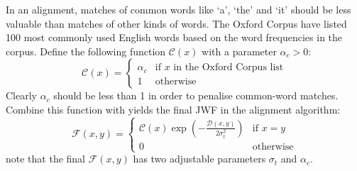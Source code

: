 In an alignment, matches of common words like `a', `the' and `it' should be less valuable than matches of other kinds of words. The Oxford Corpus have listed 100 most commonly used English words \cite{oec-common-words} based on the word frequencies in the corpus. Define the following function $\mathcal{C}(x)$ with a parameter $\alpha_c > 0$:
\begin{equation}
  \mathcal{C}(x) = 
  \begin{cases}
    \alpha_c & \text{if } x \text{ in the Oxford Corpus list}\\
    1 & \text{otherwise}
  \end{cases}
\end{equation}
Clearly $\alpha_c$ should be less than 1 in order to penalise common-word matches. Combine this function with  yields the final JWF in the alignment algorithm:
\begin{equation}
  \mathcal{F}(x,y) = 
  \begin{cases}
    \mathcal{C}(x) \exp \left(-\frac{\mathcal{D}(x,y)}{2 \sigma_t^2}\right) & \text{if } x = y\\
    0 & \text{otherwise}
  \end{cases}
  \label{eq:jwf-final}
\end{equation}
note that the final $\mathcal{F}(x,y)$ has two adjustable parameters $\sigma_t$ and $\alpha_c$.